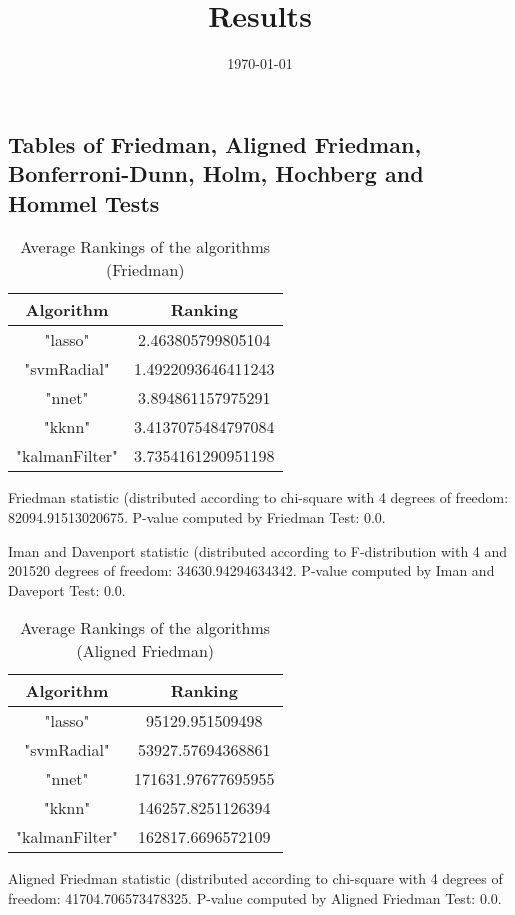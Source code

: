 \documentclass[a4paper,10pt]{article}
\title{Results}
\author{}
\date{\today}
\begin{document}
\begin{landscape}
\oddsidemargin 0in \topmargin 0in\maketitle
\section{Tables of Friedman, Aligned Friedman, Bonferroni-Dunn, Holm, Hochberg and Hommel Tests}
\begin{table}[!htp]
\centering
\caption{Average Rankings of the algorithms (Friedman)
}\begin{tabular}{c|c}
Algorithm&Ranking\\
\hline
"lasso"&2.463805799805104\\
"svmRadial"&1.4922093646411243\\
"nnet"&3.894861157975291\\
"kknn"&3.4137075484797084\\
"kalmanFilter"&3.7354161290951198\\
\end{tabular}
\end{table}


Friedman statistic (distributed according to chi-square with 4 degrees of freedom: 82094.91513020675. 
P-value computed by Friedman Test: 0.0.\newline

Iman and Davenport statistic (distributed according to F-distribution with 4 and 201520 degrees of freedom: 34630.94294634342. 
P-value computed by Iman and Daveport Test: 0.0.\newline


\newpage

\begin{table}[!htp]
\centering
\caption{Average Rankings of the algorithms (Aligned Friedman)
}\begin{tabular}{c|c}
Algorithm&Ranking\\
\hline
"lasso"&95129.951509498\\
"svmRadial"&53927.57694368861\\
"nnet"&171631.97677695955\\
"kknn"&146257.8251126394\\
"kalmanFilter"&162817.6696572109\\
\end{tabular}
\end{table}


Aligned Friedman statistic (distributed according to chi-square with 4 degrees of freedom: 41704.706573478325. 
P-value computed by Aligned Friedman Test: 0.0.\newline



\end{landscape}
\end{document}
